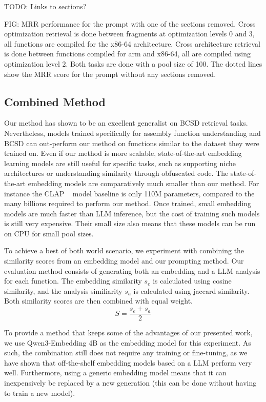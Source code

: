 \documentclass[conference,compsoc]{IEEEtran}
\begin{document}
TODO: Links to sections?

FIG: MRR performance for the prompt with one of the sections removed. Cross optimization retrieval is done between fragments at
optimization levels 0 and 3, all functions are compiled for the x86-64 architecture. Cross architecture retrieval is done between functions
compiled for arm and x86-64, all are compiled using optimization level 2. Both tasks are done with a pool size of 100. The dotted lines
show the MRR score for the prompt without any sections removed.

\subsection{Combined Method}

Our method has shown to be an excellent generalist on BCSD retrieval tasks. Nevertheless, models trained specifically for assembly
function understanding and BCSD can out-perform our method on functions similar to the dataset they were trained on.
Even if our method is more scalable, state-of-the-art embedding learning models are still useful for specific tasks, such as supporting
niche architectures or understanding similarity through obfuscated code. The state-of-the-art embedding models are comparatively much smaller
than our method. For instance the CLAP ~\cite{CLAP} model baseline is only 110M parameters, compared to the many billions required to perform our method.
Once trained, small embedding models are much faster than LLM inference, but the cost of training such models is still very expensive.
Their small size also means that these models can be run on CPU for small pool sizes.

To achieve a best of both world scenario, we experiment with combining the similarity scores from an embedding model and our prompting method.
Our evaluation method consists of generating both an embedding and a LLM analysis for each function. The embedding similarity \(s_e\) is calculated
using cosine similarity, and the analysis similiarity \(s_a\) is calculated using jaccard similarity. Both similarity scores are then combined
with equal weight.
\[
    S = \frac{s_e + s_a}{2}
\]

To provide a method that keeps some of the advantages of our presented work, we use Qwen3-Embedding 4B as the embedding model for this experiment.
As such, the combination still does not require any training or fine-tuning, as we have shown that off-the-shelf embedding models based on a LLM perform
very well. Furthermore, using a generic embedding model means that it can inexpensively be replaced by a new generation (this can be done without
having to train a new model). 
\end{document}

